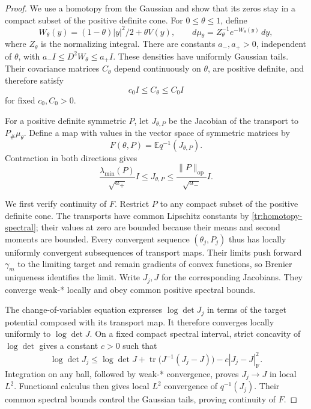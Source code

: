 \begin{proof}
We use a homotopy from the Gaussian and show that its zeros stay in a
compact subset of the positive definite cone.  For $0\le\theta\le1$,
define
\[
 W_\theta(y)=(1-\theta)|y|^2/2+\theta V(y),\qquad
 d\mu_\theta=Z_\theta^{-1}e^{-W_\theta(y)}\,dy,
\]
where $Z_\theta$ is the normalizing integral.
There are constants $a_-,a_+>0$, independent of $\theta$, with
$a_-I\le D^2W_\theta\le a_+I$.  These densities have uniformly
Gaussian tails.  Their covariance matrices $C_\theta$ depend
continuously on $\theta$, are positive definite, and therefore satisfy
\begin{equation}\label{tr:homotopy-covariance}
 c_0I\le C_\theta\le C_0I
\end{equation}
for fixed $c_0,C_0>0$.

For a positive definite symmetric $P$, let $J_{\theta,P}$ be the
Jacobian of the transport to $P_\#\mu_\theta$.  Define a map with
values in the vector space of symmetric matrices by
\[
 F(\theta,P)=\mathbb E q^{-1}(J_{\theta,P}).
\]
Contraction in both directions gives
\begin{equation}\label{tr:homotopy-spectral}
 \frac{\lambda_{\min}(P)}{\sqrt{a_+}}I
 \le J_{\theta,P}\le\frac{\|P\|_{\mathrm{op}}}{\sqrt{a_-}}I.
\end{equation}

We first verify continuity of $F$.  Restrict $P$ to any compact subset
of the positive definite cone.  The transports have common Lipschitz
constants by \eqref{tr:homotopy-spectral}; their values at zero are
bounded because their means and second moments are bounded.  Every
convergent sequence $(\theta_j,P_j)$ thus has locally uniformly
convergent subsequences of transport maps.  Their limits push forward
$\gamma_m$ to the limiting target and remain gradients of convex
functions, so Brenier uniqueness identifies the limit.  Write $J_j,J$
for the corresponding Jacobians.  They converge weak-* locally and
obey common positive spectral bounds.

The change-of-variables equation expresses $\log\det J_j$ in terms
of the target potential composed with its transport map.  It therefore
converges locally uniformly to $\log\det J$.  On a fixed compact
spectral interval, strict concavity of $\log\det$ gives a constant
$c>0$ such that
\[
 \log\det J_j\le\log\det J+
 \operatorname{tr}\bigl(J^{-1}(J_j-J)\bigr)-c|J_j-J|_{\mathrm F}^2.
\]
Integration on any ball, followed by weak-* convergence, proves
$J_j\to J$ in local $L^2$.  Functional calculus then gives local
$L^2$ convergence of $q^{-1}(J_j)$.  Their common spectral bounds
control the Gaussian tails, proving continuity of $F$.


\end{proof}
